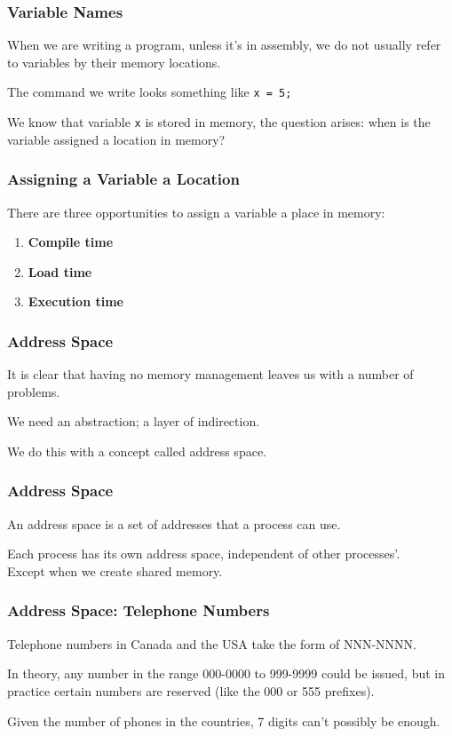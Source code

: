 \begin{frame}
\frametitle{Variable Names}

When we are writing a program, unless it's in assembly, we do not usually refer to variables by their memory locations.

The command we write looks something like \texttt{x = 5;} 

We know that variable \texttt{x} is stored in memory, the question arises: when is the variable assigned a location in memory?


\end{frame}

\begin{frame}
\frametitle{Assigning a Variable a Location}

There are three opportunities to assign a variable a place in memory:

\begin{enumerate}
	\item \textbf{Compile time}
	\item \textbf{Load time}
	\item \textbf{Execution time}
\end{enumerate}


\end{frame}

\begin{frame}
\frametitle{Address Space}

It is clear that having no memory management leaves us with a number of problems. 

We need an abstraction; a layer of indirection. 

We do this with a concept called \alert{address space}. 


\end{frame}

\begin{frame}
\frametitle{Address Space}

An address space is a set of addresses that a process can use.

Each process has its own address space, independent of other processes'.\\
\quad Except when we create shared memory.

\end{frame}



\begin{frame}
\frametitle{Address Space: Telephone Numbers}
Telephone numbers in Canada and the USA take the form of NNN-NNNN.

In theory, any number in the range 000-0000 to 999-9999 could be issued, but in practice certain numbers are reserved (like the 000 or 555 prefixes).

Given the number of phones in the countries, 7 digits can't possibly be enough.

\end{frame}

